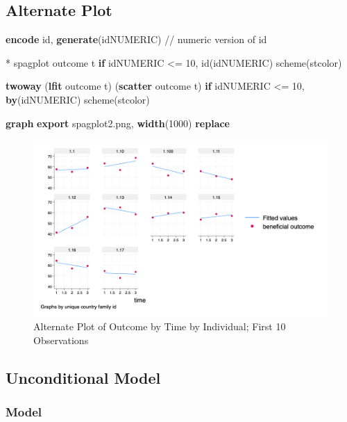 \documentclass[
  letterpaper,
  DIV=11,
  numbers=noendperiod]{scrreprt}
\newenvironment{Shaded}{\begin{snugshade}}{\end{snugshade}}
\newcommand{\CommentTok}[1]{\textcolor[rgb]{0.37,0.37,0.37}{#1}}
\newcommand{\DecValTok}[1]{\textcolor[rgb]{0.68,0.00,0.00}{#1}}
\newcommand{\KeywordTok}[1]{\textcolor[rgb]{0.00,0.23,0.31}{\textbf{#1}}}
\newcommand{\NormalTok}[1]{\textcolor[rgb]{0.00,0.23,0.31}{#1}}
\begin{document}
\subsection{Alternate Plot}\label{alternate-plot}

\begin{Shaded}
\begin{Highlighting}[]
\KeywordTok{encode}\NormalTok{ id, }\KeywordTok{generate}\NormalTok{(idNUMERIC) }\CommentTok{// numeric version of id}
    
\NormalTok{* spagplot outcome t }\KeywordTok{if}\NormalTok{ idNUMERIC \textless{}= 10, id(idNUMERIC) }\DecValTok{scheme}\NormalTok{(stcolor)}
    
\KeywordTok{twoway}\NormalTok{ (}\KeywordTok{lfit}\NormalTok{ outcome t) (}\KeywordTok{scatter}\NormalTok{ outcome t) }\KeywordTok{if}\NormalTok{ idNUMERIC \textless{}= 10, }\KeywordTok{by}\NormalTok{(idNUMERIC) }\DecValTok{scheme}\NormalTok{(stcolor)}

\KeywordTok{graph} \KeywordTok{export}\NormalTok{ spagplot2.png, }\KeywordTok{width}\NormalTok{(1000) }\KeywordTok{replace}
\end{Highlighting}
\end{Shaded}

\begin{figure}[H]

{\centering \includegraphics[width=0.5\linewidth,height=\textheight,keepaspectratio]{spagplot2.png}

}

\caption{Alternate Plot of Outcome by Time by Individual; First 10
Observations}

\end{figure}%

\subsection{Unconditional Model}\label{unconditional-model-1}

\subsubsection{Model}\label{model-1}
\end{document}
